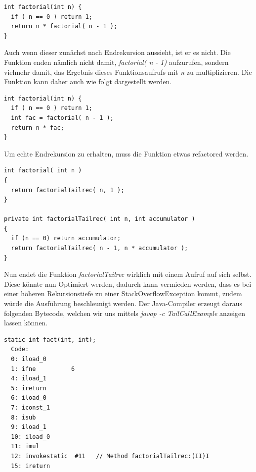 \documentclass[a4paper, 11pt]{article}
\begin{document}
	\begin{lstlisting}
int factorial(int n) {
  if ( n == 0 ) return 1;
  return n * factorial( n - 1 );
}
	\end{lstlisting}
	
	Auch wenn dieser zunächst nach Endrekursion aussieht, ist er es nicht. Die Funktion enden nämlich nicht damit, \textit{factorial( n - 1)} aufzurufen, sondern vielmehr damit, das Ergebnis dieses Funktionsaufrufs mit \textit{n} zu multiplizieren. Die Funktion kann daher auch wie folgt dargestellt werden.
	
	\begin{lstlisting}
int factorial(int n) {
  if ( n == 0 ) return 1;
  int fac = factorial( n - 1 );
  return n * fac;
}
	\end{lstlisting}

	Um echte Endrekursion zu erhalten, muss die Funktion etwas refactored werden.
	\begin{lstlisting}	
int factorial( int n )
{
  return factorialTailrec( n, 1 );
}

private int factorialTailrec( int n, int accumulator )
{
  if (n == 0) return accumulator;
  return factorialTailrec( n - 1, n * accumulator );
}
	\end{lstlisting}
	
	Nun endet die Funktion \textit{factorialTailrec} wirklich mit einem Aufruf auf sich selbst. Diese könnte nun Optimiert werden, dadurch kann vermieden werden, dass es bei einer höheren Rekursionstiefe zu einer StackOverflowException kommt, zudem würde die Ausführung beschleunigt werden. Der Java-Compiler erzeugt daraus folgenden Bytecode, welchen wir uns mittels \textit{javap -c TailCallExample} anzeigen lassen können.
	
\lstset{language=JVMIS}
\lstset{language=JVMIS}
\begin{lstlisting}
static int fact(int, int);
  Code:
  0: iload_0
  1: ifne          6
  4: iload_1
  5: ireturn
  6: iload_0
  7: iconst_1
  8: isub
  9: iload_1
  10: iload_0
  11: imul
  12: invokestatic  #11   // Method factorialTailrec:(II)I
  15: ireturn
\end{lstlisting}
	
\end{document}
